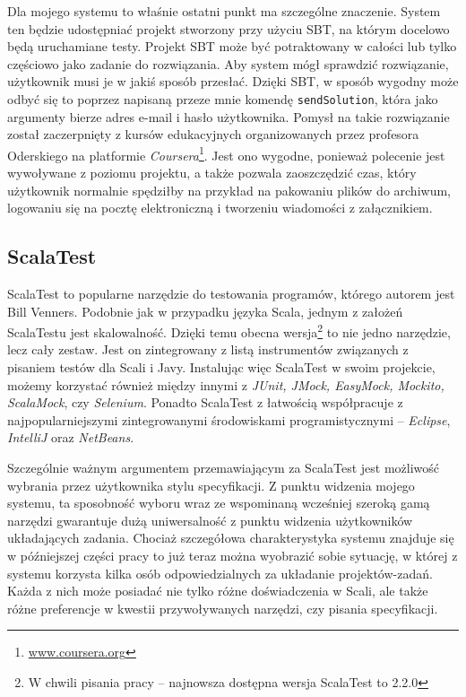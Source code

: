\documentclass[wimgr]{xmgr}
\begin{document}
Dla mojego systemu to właśnie ostatni punkt ma szczególne znaczenie. System ten będzie udostępniać projekt stworzony przy użyciu SBT, na którym docelowo będą uruchamiane testy. Projekt SBT może być potraktowany w całości lub tylko częściowo jako zadanie do rozwiązania. Aby system mógł sprawdzić rozwiązanie, użytkownik musi je w jakiś sposób przesłać. Dzięki SBT, w sposób wygodny może odbyć się to poprzez napisaną przeze mnie komendę \texttt{sendSolution}, która jako argumenty bierze adres e-mail i hasło użytkownika. Pomysł na takie rozwiązanie został zaczerpnięty z kursów edukacyjnych organizowanych przez profesora Oderskiego na platformie \textit{Coursera}\footnote{\url{www.coursera.org}}. Jest ono wygodne, ponieważ polecenie jest wywoływane z poziomu projektu, a także pozwala zaoszczędzić czas, który użytkownik normalnie spędziłby na przykład na pakowaniu plików do archiwum, logowaniu się na pocztę elektroniczną i tworzeniu wiadomości z załącznikiem.

\subsection{ScalaTest}

\label{scalaTestSrodek} 

ScalaTest to popularne narzędzie do testowania programów, którego autorem jest Bill Venners. Podobnie jak w przypadku języka Scala, jednym z założeń ScalaTestu jest skalowalność. Dzięki temu obecna wersja\footnote{W chwili pisania pracy -- najnowsza dostępna wersja ScalaTest to 2.2.0} to nie jedno narzędzie, lecz cały zestaw. Jest on zintegrowany z listą instrumentów związanych z pisaniem testów dla Scali i Javy. Instalując więc ScalaTest w swoim projekcie, możemy korzystać również między innymi z \textit{JUnit, JMock, EasyMock, Mockito, ScalaMock}, czy \textit{Selenium}. Ponadto ScalaTest z łatwością współpracuje z najpopularniejszymi zintegrowanymi środowiskami programistycznymi -- \textit{Eclipse}, \textit{IntelliJ} oraz \textit{NetBeans}.

Szczególnie ważnym argumentem przemawiającym za ScalaTest jest możliwość wybrania przez użytkownika stylu specyfikacji. Z punktu widzenia mojego systemu, ta sposobność wyboru wraz ze wspominaną wcześniej szeroką gamą narzędzi gwarantuje dużą uniwersalność z punktu widzenia użytkowników układających zadania. Chociaż szczegółowa charakterystyka systemu znajduje się w późniejszej części pracy to już teraz można wyobrazić sobie sytuację, w której z systemu korzysta kilka osób odpowiedzialnych za układanie projektów-zadań. Każda z nich może posiadać nie tylko różne doświadczenia w Scali, ale także różne preferencje w kwestii przywoływanych narzędzi, czy pisania specyfikacji. 
\end{document}
